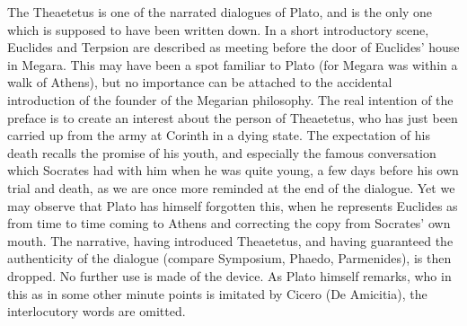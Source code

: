 \documentclass[11pt,letter]{article}
\begin{document}
\par  The Theaetetus is one of the narrated dialogues of Plato, and is the only one which is supposed to have been written down. In a short introductory scene, Euclides and Terpsion are described as meeting before the door of Euclides' house in Megara. This may have been a spot familiar to Plato (for Megara was within a walk of Athens), but no importance can be attached to the accidental introduction of the founder of the Megarian philosophy. The real intention of the preface is to create an interest about the person of Theaetetus, who has just been carried up from the army at Corinth in a dying state. The expectation of his death recalls the promise of his youth, and especially the famous conversation which Socrates had with him when he was quite young, a few days before his own trial and death, as we are once more reminded at the end of the dialogue. Yet we may observe that Plato has himself forgotten this, when he represents Euclides as from time to time coming to Athens and correcting the copy from Socrates' own mouth. The narrative, having introduced Theaetetus, and having guaranteed the authenticity of the dialogue (compare Symposium, Phaedo, Parmenides), is then dropped. No further use is made of the device. As Plato himself remarks, who in this as in some other minute points is imitated by Cicero (De Amicitia), the interlocutory words are omitted.
\end{document}
